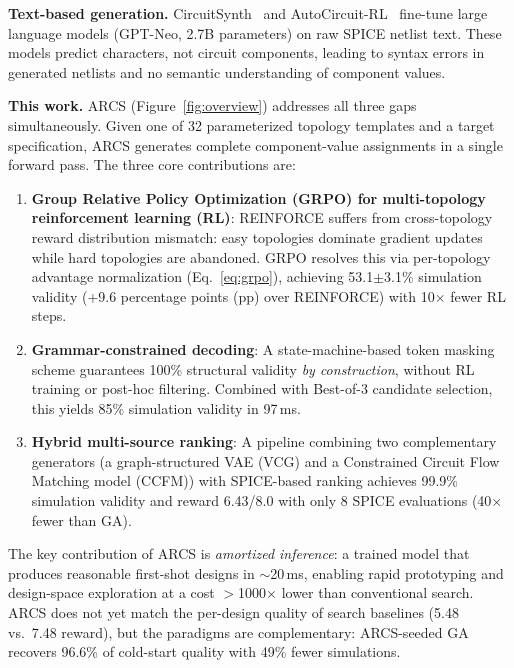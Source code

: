 \documentclass[conference]{IEEEtran}
\begin{document}
\textbf{Text-based generation.} CircuitSynth~\cite{circuitsynth} and
AutoCircuit-RL~\cite{autocircuitrl} fine-tune large language models
(GPT-Neo, 2.7B parameters) on raw SPICE netlist text. These models
predict characters, not circuit components, leading to syntax errors in
generated netlists and no semantic understanding of component values.

\textbf{This work.} ARCS (Figure~\ref{fig:overview}) addresses all three gaps
simultaneously. Given one of 32 parameterized topology templates and a
target specification, ARCS generates complete component-value assignments
in a single forward pass. The three core contributions are:
\begin{enumerate}
    \item \textbf{Group Relative Policy Optimization (GRPO) for
    multi-topology reinforcement learning (RL)}: REINFORCE suffers
    from cross-topology reward
    distribution mismatch: easy topologies dominate gradient
    updates while hard topologies are abandoned. GRPO resolves this
    via per-topology advantage
    normalization (Eq.~\ref{eq:grpo}), achieving 53.1$\pm$3.1\%
    simulation validity (+9.6 percentage points (pp) over REINFORCE) with 10$\times$
    fewer RL steps.
    \item \textbf{Grammar-constrained decoding}: A state-machine-based
    token masking scheme guarantees 100\% structural validity \emph{by
    construction}, without RL training or post-hoc filtering. Combined
    with Best-of-3 candidate selection, this yields 85\% simulation
    validity in 97\,ms.
    \item \textbf{Hybrid multi-source ranking}: A pipeline combining
    two complementary generators (a graph-structured VAE (VCG) and a
    Constrained Circuit Flow Matching model (CCFM)) with SPICE-based
    ranking achieves 99.9\% simulation validity and reward 6.43/8.0
    with only 8 SPICE evaluations (40$\times$ fewer than GA).
\end{enumerate}

The key contribution of ARCS is \emph{amortized inference}: a trained
model that produces reasonable first-shot designs in $\sim$20\,ms,
enabling rapid prototyping and design-space exploration at a cost
$>$1000$\times$ lower than conventional search. ARCS does not yet match
the per-design quality of search baselines (5.48 vs.\ 7.48 reward), but
the paradigms are complementary: ARCS-seeded GA recovers 96.6\%
of cold-start quality with 49\% fewer simulations.
\end{document}
